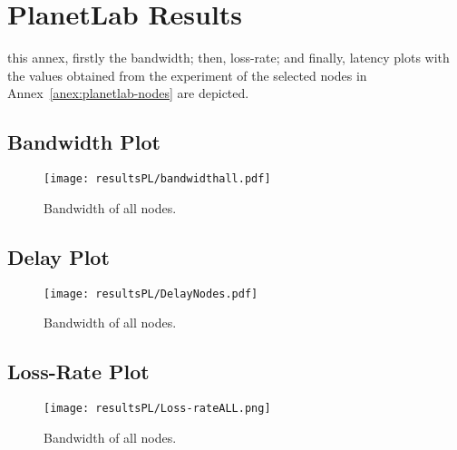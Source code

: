 \chapter{PlanetLab Results}

 this annex, firstly the bandwidth; then, loss-rate; and finally, latency
plots with the values obtained from the \pl experiment of the selected nodes in Annex~\ref{anex:planetlab-nodes} are depicted.
\clearpage
\section{Bandwidth Plot}
\begin{center}
\begin{figure}[H]
  \centering
  \texttt{[image: resultsPL/bandwidthall.pdf]}\\
  \caption{Bandwidth of all nodes.} \label{fig:bandwidth-plot}
\end{figure}
\end{center}
\clearpage
\section{Delay Plot}
\begin{center}
\begin{figure}[H]
  \centering
  \texttt{[image: resultsPL/DelayNodes.pdf]}\\
  \caption{Bandwidth of all nodes.} \label{fig:delay-plot}
\end{figure}
\end{center}
\clearpage
\section{Loss-Rate Plot}
\begin{center}
\begin{figure}[H]
  \centering
  \texttt{[image: resultsPL/Loss-rateALL.png]}\\
  \caption{Bandwidth of all nodes.} \label{fig:loss-rate-plot}
\end{figure}
\end{center}
\clearpage

